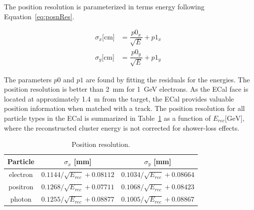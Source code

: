The position resolution is parameterized in terms energy following Equation~\eqref{eq:posnRes}.
 
\begin{equation}
\label{eq:posnRes}
\begin{split}
\sigma_x \textrm{[cm]}& =  \dfrac{p0_x}{\sqrt{E}}+p1_x\\
\sigma_y \textrm{[cm]}& =  \dfrac{p0_y}{\sqrt{E}}+p1_y
\end{split}
\end{equation}

The parameters $p0$ and $p1$ are found by fitting the residuals for the energies. The position resolution is better than 2~mm for 1~GeV electrons. As the ECal face is located at  approximately 1.4~m from the target, the ECal provides valuable position information when matched with a track. The position resolution for all particle types in the ECal is summarized in Table~\ref{tab:PosnResTable} as a function of $E_{rec}\textrm{[GeV]}$, where the reconstructed cluster energy is not corrected for shower-loss effects. 

\begin{table}[htb]
\caption{Position resolution.}
\label{tab:PosnResTable}
\centering
\begin{tabular}{|c|c|c|}
\toprule
Particle & $\sigma_x$ [mm] & $\sigma_y$ [mm] \\
\midrule
electron & $0.1144/\sqrt{E_{rec}}+0.08112$ & $0.1034/\sqrt{E_{rec}}+0.08664$ \\
positron & $0.1268/\sqrt{E_{rec}}+0.07711$ & $0.1068/\sqrt{E_{rec}}+0.08423$ \\
photon & $0.1255/\sqrt{E_{rec}}+0.08877$ & $0.1005/\sqrt{E_{rec}}+0.08867$ \\
\bottomrule
\end{tabular}
\end{table}